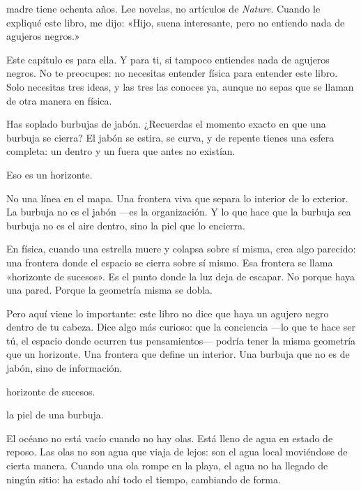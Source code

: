 \mainmatter
{}
\noindent {} madre tiene ochenta años. Lee novelas, no artículos de \emph{Nature}. Cuando le expliqué este libro, me dijo: «Hijo, suena interesante, pero no entiendo nada de agujeros negros.»

Este capítulo es para ella. Y para ti, si tampoco entiendes nada de agujeros negros. No te preocupes: no necesitas entender física para entender este libro. Solo necesitas tres ideas, y las tres las conoces ya, aunque no sepas que se llaman de otra manera en física.

\noindent Has soplado burbujas de jabón. ¿Recuerdas el momento exacto en que una burbuja se cierra? El jabón se estira, se curva, y de repente tienes una esfera completa: un dentro y un fuera que antes no existían.

Eso es un horizonte.

No una línea en el mapa. Una frontera viva que separa lo interior de lo exterior. La burbuja no es el jabón —es la organización. Y lo que hace que la burbuja sea burbuja no es el aire dentro, sino la piel que lo encierra.

En física, cuando una estrella muere y colapsa sobre sí misma, crea algo parecido: una frontera donde el espacio se cierra sobre sí mismo. Esa frontera se llama «horizonte de sucesos». Es el punto donde la luz deja de escapar. No porque haya una pared. Porque la geometría misma se dobla.

Pero aquí viene lo importante: este libro no dice que haya un agujero negro dentro de tu cabeza. Dice algo más curioso: que la conciencia —lo que te hace ser tú, el espacio donde ocurren tus pensamientos— podría tener la misma geometría que un horizonte. Una frontera que define un interior. Una burbuja que no es de jabón, sino de información.

\begin{fisica}
 horizonte de sucesos.

 la piel de una burbuja.
\end{fisica}
\noindent El océano no está vacío cuando no hay olas. Está lleno de agua en estado de reposo. Las olas no son agua que viaja de lejos: son el agua local moviéndose de cierta manera. Cuando una ola rompe en la playa, el agua no ha llegado de ningún sitio: ha estado ahí todo el tiempo, cambiando de forma.


